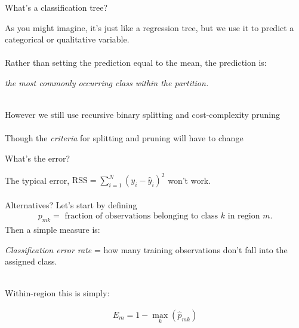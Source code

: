 \documentclass[mathserif, aspectratio=169]{beamer}
\begin{document}
\begin{frame}{What's a classification tree?}

As you might imagine, it's just like a regression tree, but we use it to predict a categorical or qualitative variable.  \\~\\

Rather than setting the prediction equal to the mean, the prediction is:
\pause
\begin{center}
 \textit{the most commonly occurring class within the partition.  \\~\\}
\end{center}

However we still use recursive binary splitting and cost-complexity pruning\\~\\

Though the \textit{criteria} for splitting and pruning will have to change

\end{frame}

\begin{frame}{What's the error?}

The typical error, $\text{RSS} = \sum_{i=1}^N (y_i-\hat{y}_i)^2$ won't work.  \\~\\

Alternatives?  Let's start by defining 
\begin{align*}
p_{mk} = \text{ fraction of observations belonging to class $k$ in region $m$.}
\end{align*}
Then a simple measure is:

\begin{center}
\textit{Classification error rate} = how many training observations don't fall into the assigned class.   \\~\\
\end{center}

 Within-region this is simply:

\begin{align*}
E_m = 1- \max_k (\hat{p}_{mk})
\end{align*}
\end{frame}
\end{document}
